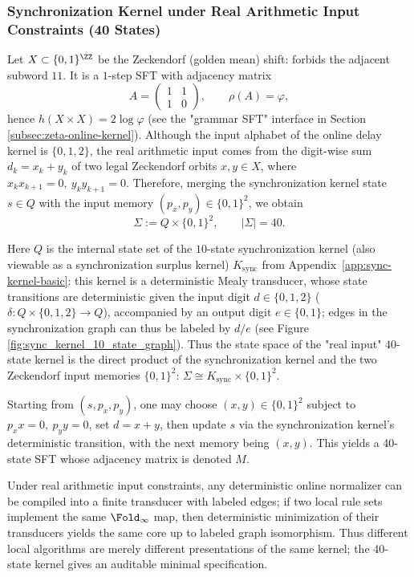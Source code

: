 \subsubsection{Synchronization Kernel under Real Arithmetic Input Constraints (40 States)}\label{app:real-input-40-kernel}
Let $X\subset\{0,1\}^{\ZZ}$ be the Zeckendorf (golden mean) shift: forbids the adjacent subword $11$. It is a $1$-step SFT with adjacency matrix
\[
A=\begin{pmatrix}1&1\\[2pt]1&0\end{pmatrix},\qquad \rho(A)=\varphi,
\]
hence $h(X\times X)=2\log\varphi$ (see the "grammar SFT" interface in Section \ref{subsec:zeta-online-kernel}).
Although the input alphabet of the online delay kernel is $\{0,1,2\}$, the real arithmetic input comes from the digit-wise sum $d_k=x_k+y_k$ of two legal Zeckendorf orbits
$x,y\in X$, where $x_kx_{k+1}=0,\ y_ky_{k+1}=0$.
Therefore, merging the synchronization kernel state $s\in Q$ with the input memory $(p_x,p_y)\in\{0,1\}^2$, we obtain
\[
\Sigma:=Q\times\{0,1\}^2,\qquad |\Sigma|=40.
\]
\begin{remark}\label{rem:real-input-40-product-kernel}
Here \(Q\) is the internal state set of the \(10\)-state synchronization kernel (also viewable as a synchronization surplus kernel) \(K_{\mathrm{sync}}\) from Appendix~\ref{app:sync-kernel-basic}: this kernel is a deterministic Mealy transducer,
whose state transitions are deterministic given the input digit \(d\in\{0,1,2\}\) ($\delta:Q\times\{0,1,2\}\to Q$), accompanied by an output digit \(e\in\{0,1\}\);
edges in the synchronization graph can thus be labeled by \(d/e\) (see Figure \ref{fig:sync_kernel_10_state_graph}).
Thus the state space of the "real input" \(40\)-state kernel is the direct product of the synchronization kernel and the two Zeckendorf input memories \(\{0,1\}^2\):
\(\Sigma\cong K_{\mathrm{sync}}\times\{0,1\}^2\).
\end{remark}
Starting from $(s,p_x,p_y)$, one may choose $(x,y)\in\{0,1\}^2$ subject to $p_xx=0,\ p_yy=0$,
set $d=x+y$, then update $s$ via the synchronization kernel's deterministic transition, with the next memory being $(x,y)$.
This yields a 40-state SFT whose adjacency matrix is denoted $M$.

\begin{remark}\label{rem:real-input-40-minimal-kernel}
Under real arithmetic input constraints, any deterministic online normalizer can be compiled into a finite transducer with labeled edges; if two local rule sets implement the same $\Fold_\infty$ map, then deterministic minimization of their transducers yields the same core up to labeled graph isomorphism. Thus different local algorithms are merely different presentations of the same kernel; the 40-state kernel gives an auditable minimal specification.
\end{remark}

